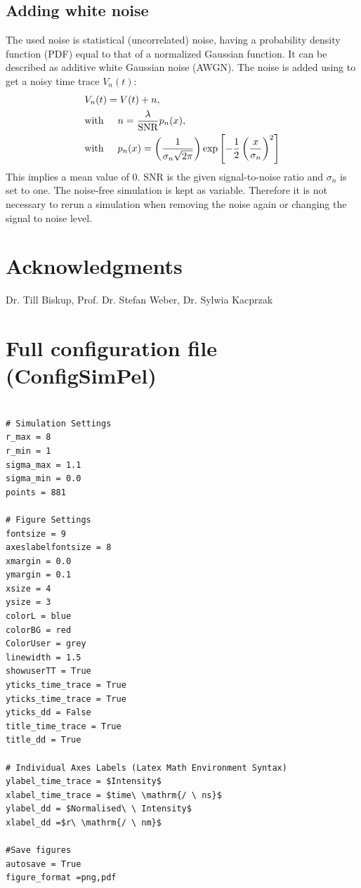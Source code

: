 \documentclass[pdftex,bezier,german,a4,twoside, headexclude,12pt,nochapterprefix, titlepage]{extarticle}
\begin{document}
\subsection{Adding white noise}
The used noise is statistical (uncorrelated) noise, having a probability density function (PDF) equal to that of a normalized Gaussian function.
It can be described as additive white Gaussian noise (AWGN). The noise is added using to get a noisy time trace $V_n(t)$:
\begin{align}
\begin{split}
 & V_n(t) = V(t)+n,\\
 &\mbox{with}\hspace{0.5cm} n = \dfrac{\lambda}{\text{SNR}}p_n(x), \\
 &\mbox{with}\hspace{0.5cm} p_n(x) = \left(\dfrac{1}{\sigma_n \sqrt{2\pi}}\right)
 \mathrm{exp}\left[-\frac{1}{2}\left(\frac{x}{\sigma_n}\right)^2\right]
 \end{split}
\end{align}
This implies a mean value of $0$. SNR is the given signal-to-noise ratio and $\sigma_n$ is set to one.
The noise-free simulation is kept as variable. Therefore it is not necessary to rerun a simulation when removing the noise again or
changing the signal to noise level.
\newpage
\section{Acknowledgments}
Dr. Till Biskup,
Prof. Dr. Stefan Weber,
Dr. Sylwia Kacprzak

\newpage
\section{Full configuration file (ConfigSimPel)}
\begin{lstlisting}[caption={Complete configuration file of the default settings of SimPel},label = full_config_list]

# Simulation Settings
r_max = 8
r_min = 1
sigma_max = 1.1
sigma_min = 0.0
points = 881

# Figure Settings
fontsize = 9
axeslabelfontsize = 8
xmargin = 0.0
ymargin = 0.1
xsize = 4
ysize = 3 
colorL = blue
colorBG = red
ColorUser = grey
linewidth = 1.5
showuserTT = True
yticks_time_trace = True
yticks_time_trace = True
yticks_dd = False
title_time_trace = True
title_dd = True

# Individual Axes Labels (Latex Math Environment Syntax)
ylabel_time_trace = $Intensity$
xlabel_time_trace = $time\ \mathrm{/ \ ns}$
ylabel_dd = $Normalised\ \ Intensity$
xlabel_dd =$r\ \mathrm{/ \ nm}$

#Save figures
autosave = True
figure_format =png,pdf
\end{lstlisting}
\end{document}
